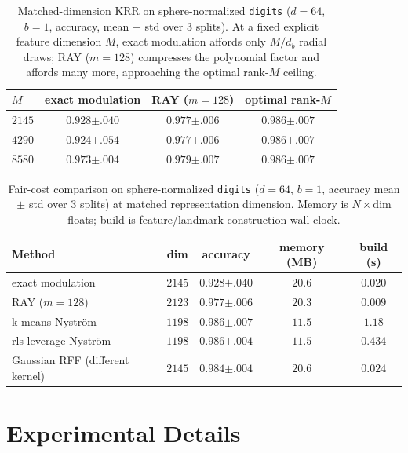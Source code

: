 \documentclass{article}
\begin{document}
\begin{table}[h]
\centering
\caption{Matched-dimension KRR on sphere-normalized \texttt{digits} ($d=64$, $b=1$, accuracy, mean $\pm$ std over $3$ splits). At a fixed explicit feature dimension $M$, exact modulation affords only $M/d_b$ radial draws; RAY ($m=128$) compresses the polynomial factor and affords many more, approaching the optimal rank-$M$ ceiling.}
\label{tab:ts}
\begin{tabular}{lccc}
\toprule
$M$ & exact modulation & RAY ($m{=}128$) & optimal rank-$M$ \\
\midrule
$2145$ & $0.928{\scriptstyle\pm.040}$ & $\mathbf{0.977}{\scriptstyle\pm.006}$ & $0.986{\scriptstyle\pm.007}$ \\
$4290$ & $0.924{\scriptstyle\pm.054}$ & $0.977{\scriptstyle\pm.006}$ & $0.986{\scriptstyle\pm.007}$ \\
$8580$ & $0.973{\scriptstyle\pm.004}$ & $0.979{\scriptstyle\pm.007}$ & $0.986{\scriptstyle\pm.007}$ \\
\bottomrule
\end{tabular}
\end{table}

\begin{table}[h]
\centering
\caption{Fair-cost comparison on sphere-normalized \texttt{digits} ($d=64$, $b=1$, accuracy mean $\pm$ std over $3$ splits) at matched representation dimension. Memory is $N\times\text{dim}$ floats; build is feature/landmark construction wall-clock.}
\label{tab:faircost}
\begin{tabular}{lcccc}
\toprule
Method & dim & accuracy & memory (MB) & build (s) \\
\midrule
exact modulation & $2145$ & $0.928{\scriptstyle\pm.040}$ & $20.6$ & $0.020$ \\
RAY ($m{=}128$) & $2123$ & $0.977{\scriptstyle\pm.006}$ & $20.3$ & $\mathbf{0.009}$ \\
k-means Nystr\"om & $1198$ & $\mathbf{0.986}{\scriptstyle\pm.007}$ & $\mathbf{11.5}$ & $1.18$ \\
rls-leverage Nystr\"om & $1198$ & $\mathbf{0.986}{\scriptstyle\pm.004}$ & $\mathbf{11.5}$ & $0.434$ \\
\midrule
Gaussian RFF (different kernel) & $2145$ & $0.984{\scriptstyle\pm.004}$ & $20.6$ & $0.024$ \\
\bottomrule
\end{tabular}
\end{table}

\section{Experimental Details}
\label{app:exp_details}
\end{document}
